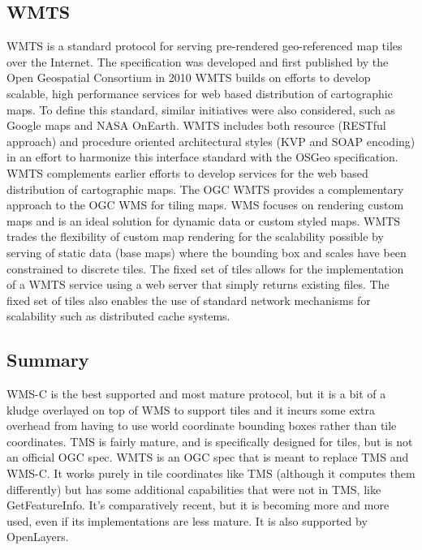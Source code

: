 \documentclass[11pt,a4paper,titlepage,oneside]{report}
\begin{document}
  \subsection{WMTS}
\gls{WMTS} is a standard \gls{protocol} for serving pre-rendered geo-referenced map tiles over the Internet. The specification was developed and first published by the Open Geospatial Consortium in 2010
    \gls{WMTS} builds on efforts to develop scalable, high performance services for web based distribution of cartographic maps. To define this standard, similar initiatives were also considered, such as Google maps and NASA OnEarth. \gls{WMTS} includes both resource (RESTful approach) and procedure oriented architectural styles (KVP and SOAP encoding) in an effort to harmonize this interface standard with the OSGeo specification.
    \gls{WMTS} complements earlier efforts to develop services for the web based distribution of cartographic maps. The \gls{OGC} \gls{WMTS} provides a complementary approach to the \gls{OGC} \gls{WMS} for tiling maps. \gls{WMS} focuses on rendering custom maps and is an ideal solution for dynamic data or custom styled maps. \gls{WMTS} trades the flexibility of custom map rendering for the scalability possible by serving of static data (base maps) where the bounding box and scales have been constrained to discrete tiles. The fixed set of tiles allows for the implementation of a \gls{WMTS} service using a web server that simply returns existing files. The fixed set of tiles also enables the use of standard network mechanisms for scalability such as distributed cache systems. \cite{WMTS:Web}

  \subsection{Summary}
    WMS-C is the best supported and most mature \gls{protocol}, but it is a bit of a kludge overlayed on top of \gls{WMS} to support tiles and it incurs some extra overhead from having to use world coordinate bounding boxes rather than tile coordinates.
    \gls{TMS} is fairly mature, and is specifically designed for tiles, but is not an official \gls{OGC} spec.
    \gls{WMTS} is an \gls{OGC} spec that is meant to replace \gls{TMS} and WMS-C. It works purely in tile coordinates like \gls{TMS} (although it computes them differently) but has some additional capabilities that were not in \gls{TMS}, like GetFeatureInfo. It's comparatively recent, but it is becoming more and more used, even if its implementations are less mature. It is also supported by OpenLayers.
\end{document}
